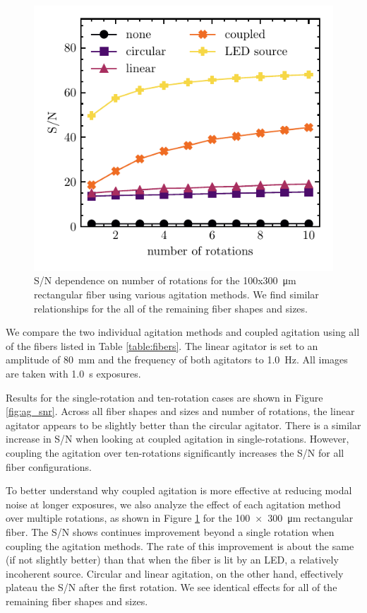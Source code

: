 \documentclass[twocolumn]{emulateapj}
\begin{document}
\begin{figure}
\centering
	\includegraphics[width=\columnwidth]{images/rect_snr_vs_time.pdf}
	\caption{S/N dependence on number of rotations for the 100x\SI{300}{\micro\meter} rectangular fiber using various agitation methods. We find similar relationships for the all of the remaining fiber shapes and sizes.}
\label{fig:rect_snr_vs_time}
\end{figure}

We compare the two individual agitation methods and coupled agitation using all of the fibers listed in Table \ref{table:fibers}. The linear agitator is set to an amplitude of \SI{80}{\milli\meter} and the frequency of both agitators to \SI{1.0}{\hertz}. All images are taken with \SI{1.0}{\second} exposures.

Results for the single-rotation and ten-rotation cases are shown in Figure \ref{fig:ag_snr}. Across all fiber shapes and sizes and number of rotations, the linear agitator appears to be slightly better than the circular agitator. There is a similar increase in S/N when looking at coupled agitation in single-rotations. However, coupling the agitation over ten-rotations significantly increases the S/N for all fiber configurations.

To better understand why coupled agitation is more effective at reducing modal noise at longer exposures, we also analyze the effect of each agitation method over multiple rotations, as shown in Figure \ref{fig:rect_snr_vs_time} for the \SI{100x300}{\micro\meter} rectangular fiber. The S/N shows continues improvement beyond a single rotation when coupling the agitation methods. The rate of this improvement is about the same (if not slightly better) than that when the fiber is lit by an LED, a relatively incoherent source. Circular and linear agitation, on the other hand, effectively plateau the S/N after the first rotation. We see identical effects for all of the remaining fiber shapes and sizes.
\end{document}
